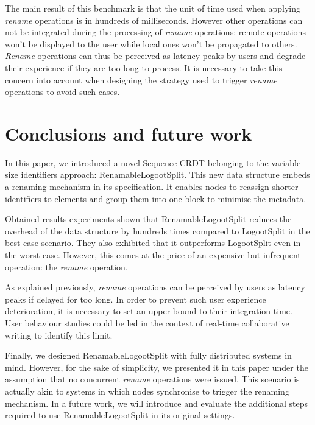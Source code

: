 \documentclass[sigplan,10pt]{acmart}
\begin{document}
The main result of this benchmark is that the unit of time used when applying \emph{rename} operations is in hundreds of milliseconds.
However other operations can not be integrated during the processing of \emph{rename} operations: remote operations won't be displayed to the user while local ones won't be propagated to others.
\emph{Rename} operations can thus be perceived as latency peaks by users and degrade their experience if they are too long to process.
It is necessary to take this concern into account when designing the strategy used to trigger \emph{rename} operations to avoid such cases.

\section{Conclusions and future work}
\label{sec:conclusion}

\begin{sloppypar}
In this paper, we introduced a novel Sequence \ac{CRDT} belonging to the variable-size identifiers approach: RenamableLogootSplit.
This new data structure embeds a renaming mechanism in its specification.
It enables nodes to reassign shorter identifiers to elements and group them into one block to minimise the metadata.
\end{sloppypar}

\begin{sloppypar}
Obtained results experiments shown that RenamableLogootSplit reduces the overhead of the data structure by hundreds times compared to LogootSplit in the best-case scenario.
They also exhibited that it outperforms LogootSplit even in the worst-case.
However, this comes at the price of an expensive but infrequent operation: the \emph{rename} operation.
\end{sloppypar}

As explained previously, \emph{rename} operations can be perceived by users as latency peaks if delayed for too long.
In order to prevent such user experience deterioration, it is necessary to set an upper-bound to their integration time.
User behaviour studies could be led in the context of real-time collaborative writing to identify this limit.

Finally, we designed RenamableLogootSplit with fully distributed systems in mind.
However, for the sake of simplicity, we presented it in this paper under the assumption that no concurrent \emph{rename} operations were issued.
This scenario is actually akin to systems in which nodes synchronise to trigger the renaming mechanism.
In a future work, we will introduce and evaluate the additional steps required to use RenamableLogootSplit in its original settings.


\end{document}
